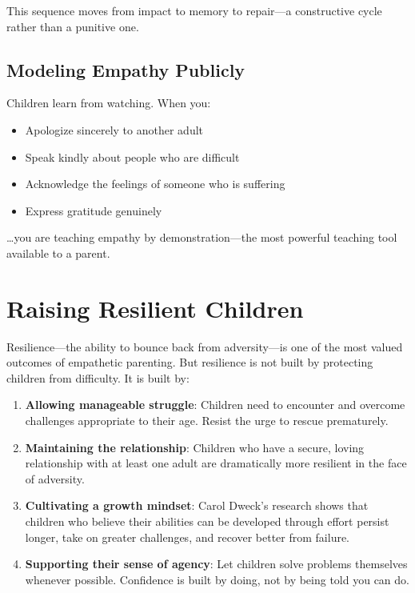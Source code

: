 This sequence moves from impact to memory to repair---a constructive
cycle rather than a punitive one.

\subsection{Modeling Empathy Publicly}

Children learn from watching. When you:
\begin{itemize}
  \item Apologize sincerely to another adult
  \item Speak kindly about people who are difficult
  \item Acknowledge the feelings of someone who is suffering
  \item Express gratitude genuinely
\end{itemize}

\ldots you are teaching empathy by demonstration---the most powerful
teaching tool available to a parent.

\section{Raising Resilient Children}

Resilience---the ability to bounce back from adversity---is one of the
most valued outcomes of empathetic parenting. But resilience is not built
by protecting children from difficulty. It is built by:

\begin{enumerate}
  \item \textbf{Allowing manageable struggle}: Children need to encounter
        and overcome challenges appropriate to their age. Resist the
        urge to rescue prematurely.
  \item \textbf{Maintaining the relationship}: Children who have a secure,
        loving relationship with at least one adult are dramatically more
        resilient in the face of adversity.
  \item \textbf{Cultivating a growth mindset}: Carol Dweck's \citep{dweck2006} research
        shows that children who believe their abilities can be developed
        through effort persist longer, take on greater challenges, and
        recover better from failure.
  \item \textbf{Supporting their sense of agency}: Let children solve
        problems themselves whenever possible. Confidence is built by
        doing, not by being told you can do.
\end{enumerate}

